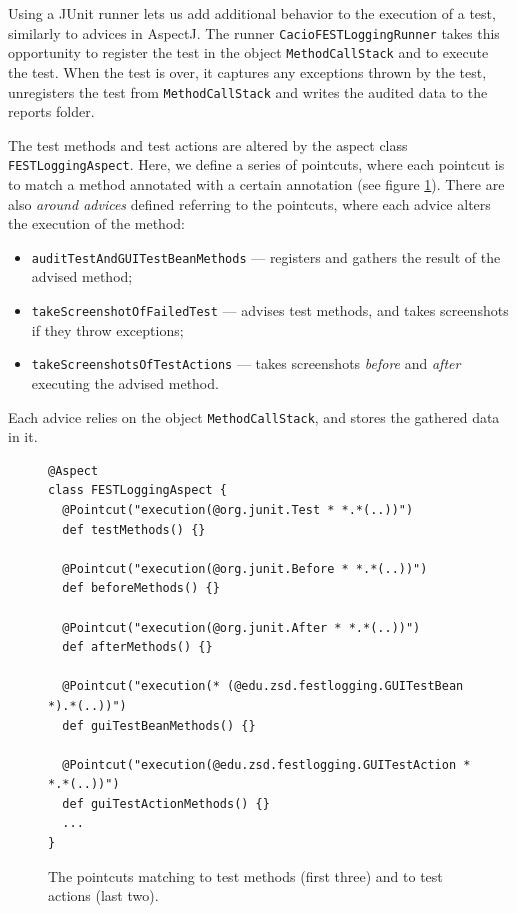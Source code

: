 Using a JUnit runner lets us add additional behavior to the execution of a test, similarly to advices in AspectJ. The runner \texttt{CacioFESTLoggingRunner} takes this opportunity to register the test in the object \texttt{MethodCallStack} and to execute the test. When the test is over, it captures any exceptions thrown by the test, unregisters the test from \texttt{MethodCallStack} and writes the audited data to the reports folder.

The test methods and test actions are altered by the aspect class \texttt{FESTLoggingAspect}. Here, we define a series of pointcuts, where each pointcut is to match a method annotated with a certain annotation (see figure \ref{fig:fest-logging-pointcuts}). There are also \emph{around advices} defined referring to the pointcuts, where each advice alters the execution of the method:
\begin{itemize}
\item \texttt{auditTestAndGUITestBeanMethods} --- registers and gathers the result of the advised method;
\item \texttt{takeScreenshotOfFailedTest} --- advises test methods, and takes screenshots if they throw exceptions;
\item \texttt{takeScreenshotsOfTestActions} --- takes screenshots \emph{before} and \emph{after} executing the advised method.
\end{itemize}
Each advice relies on the object \texttt{MethodCallStack}, and stores the gathered data in it.

\begin{figure}[h!]
\centering
\begin{lstlisting}
@Aspect
class FESTLoggingAspect {
  @Pointcut("execution(@org.junit.Test * *.*(..))")
  def testMethods() {}

  @Pointcut("execution(@org.junit.Before * *.*(..))")
  def beforeMethods() {}

  @Pointcut("execution(@org.junit.After * *.*(..))")
  def afterMethods() {}

  @Pointcut("execution(* (@edu.zsd.festlogging.GUITestBean *).*(..))")
  def guiTestBeanMethods() {}

  @Pointcut("execution(@edu.zsd.festlogging.GUITestAction * *.*(..))")
  def guiTestActionMethods() {}
  ...
}
\end{lstlisting}
\caption{The pointcuts matching to test methods (first three) and to test actions (last two).}
\label{fig:fest-logging-pointcuts}
\end{figure}

